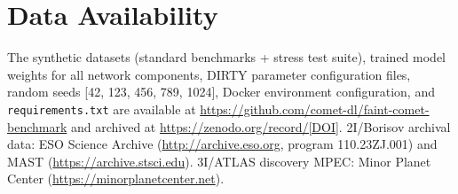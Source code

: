 \documentclass[preprint2]{aastex631}
\begin{document}
\section*{Data Availability}
The synthetic datasets (standard benchmarks + stress test suite), trained model weights for all network components, DIRTY parameter configuration files, random seeds [42, 123, 456, 789, 1024], Docker environment configuration, and \texttt{requirements.txt} are available at \url{https://github.com/comet-dl/faint-comet-benchmark} and archived at \url{https://zenodo.org/record/[DOI]}. 2I/Borisov archival data: ESO Science Archive (\url{http://archive.eso.org}, program 110.23ZJ.001) and MAST (\url{https://archive.stsci.edu}). 3I/ATLAS discovery MPEC: Minor Planet Center (\url{https://minorplanetcenter.net}).


\end{document}
